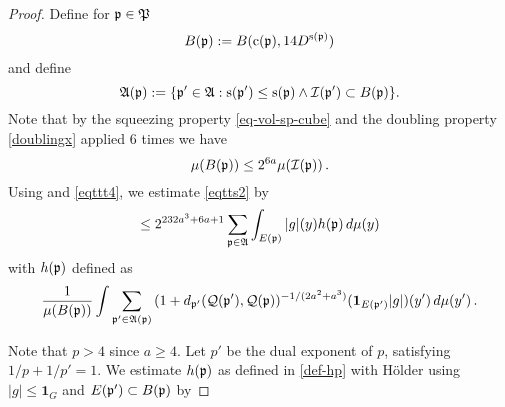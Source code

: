 \begin{proof}
Define for ${\mathfrak p}\in {\mathfrak P}$
\begin{equation}
    B({\mathfrak p}):=B({\mathrm{c}}({\mathfrak p}), 14D^{{\mathrm{s}}({\mathfrak p})})
\end{equation}
and define
\begin{equation}
    \label{eq-Dp-definition}
    \mathfrak{A}({\mathfrak p}):=\{{\mathfrak p}'\in\mathfrak{A}: {\mathrm{s}}({\mathfrak p}')\leq {\mathrm{s}}({\mathfrak p}) \land {\mathcal{I}}({\mathfrak p}') \subset B({\mathfrak p})\}.
\end{equation}
Note that by the squeezing property \eqref{eq-vol-sp-cube}
and the doubling property \eqref{doublingx} applied
$6$ times we have
\begin{equation}\label{eqttt4}
    \mu(B({\mathfrak p}))\le 2^{6a} \mu({\mathcal{I}}({\mathfrak p}))\, .
\end{equation}
Using  and \eqref{eqttt4}, we estimate \eqref{eqtts2} by
\begin{equation}\label{eqtts3}
     \le 2^{232a^3+6a+1} \sum_{{\mathfrak p}\in \mathfrak{A}}
    \int_{E({\mathfrak p})}|g|(y) h({\mathfrak p})\, d\mu(y)
\end{equation}
with $h({\mathfrak p})$ defined as
\begin{equation}\label{def-hp}
    \frac 1{\mu(B({\mathfrak p}))}\int \sum_{{\mathfrak p}'\in \mathfrak{A}({\mathfrak p})}
    {(1+d_{{\mathfrak p}'}({\mathcal{Q}}({\mathfrak p}'), {\mathcal{Q}}({\mathfrak p}))^{-1/(2a^2+a^3)}}(\mathbf{1}_{E({\mathfrak p}')}|g|)(y')\, d\mu(y')\,.
\end{equation}

Note that $p>4$ since $a\ge 4$. Let $p'$ be the dual exponent of $p$, satisfying $1/p+1/p'=1$.
We estimate $h({\mathfrak p})$ as defined in \eqref{def-hp} with H\"older using $|g|\le \mathbf{1}_G$ and $E({\mathfrak p}')\subset B({\mathfrak p})$ by


\end{proof}
